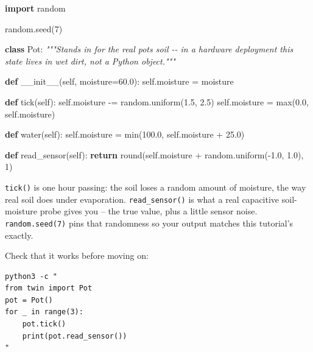 \documentclass[
  12pt,
  a4paper,
]{article}
\newenvironment{Shaded}{}{}
\newcommand{\BuiltInTok}[1]{\textcolor[rgb]{0.00,0.50,0.00}{#1}}
\newcommand{\CommentTok}[1]{\textcolor[rgb]{0.38,0.63,0.69}{\textit{#1}}}
\newcommand{\ControlFlowTok}[1]{\textcolor[rgb]{0.00,0.44,0.13}{\textbf{#1}}}
\newcommand{\DecValTok}[1]{\textcolor[rgb]{0.25,0.63,0.44}{#1}}
\newcommand{\FloatTok}[1]{\textcolor[rgb]{0.25,0.63,0.44}{#1}}
\newcommand{\FunctionTok}[1]{\textcolor[rgb]{0.02,0.16,0.49}{#1}}
\newcommand{\ImportTok}[1]{\textcolor[rgb]{0.00,0.50,0.00}{\textbf{#1}}}
\newcommand{\KeywordTok}[1]{\textcolor[rgb]{0.00,0.44,0.13}{\textbf{#1}}}
\newcommand{\NormalTok}[1]{#1}
\newcommand{\OperatorTok}[1]{\textcolor[rgb]{0.40,0.40,0.40}{#1}}
\newcommand{\VariableTok}[1]{\textcolor[rgb]{0.10,0.09,0.49}{#1}}
\begin{document}
\begin{Shaded}
\begin{Highlighting}[]
\ImportTok{import}\NormalTok{ random}

\NormalTok{random.seed(}\DecValTok{7}\NormalTok{)}


\KeywordTok{class}\NormalTok{ Pot:}
    \CommentTok{"""Stands in for the real pot\textquotesingle{}s soil {-}{-} in a hardware deployment this}
\CommentTok{    state lives in wet dirt, not a Python object."""}

    \KeywordTok{def} \FunctionTok{\_\_init\_\_}\NormalTok{(}\VariableTok{self}\NormalTok{, moisture}\OperatorTok{=}\FloatTok{60.0}\NormalTok{):}
        \VariableTok{self}\NormalTok{.moisture }\OperatorTok{=}\NormalTok{ moisture}

    \KeywordTok{def}\NormalTok{ tick(}\VariableTok{self}\NormalTok{):}
        \VariableTok{self}\NormalTok{.moisture }\OperatorTok{{-}=}\NormalTok{ random.uniform(}\FloatTok{1.5}\NormalTok{, }\FloatTok{2.5}\NormalTok{)}
        \VariableTok{self}\NormalTok{.moisture }\OperatorTok{=} \BuiltInTok{max}\NormalTok{(}\FloatTok{0.0}\NormalTok{, }\VariableTok{self}\NormalTok{.moisture)}

    \KeywordTok{def}\NormalTok{ water(}\VariableTok{self}\NormalTok{):}
        \VariableTok{self}\NormalTok{.moisture }\OperatorTok{=} \BuiltInTok{min}\NormalTok{(}\FloatTok{100.0}\NormalTok{, }\VariableTok{self}\NormalTok{.moisture }\OperatorTok{+} \FloatTok{25.0}\NormalTok{)}

    \KeywordTok{def}\NormalTok{ read\_sensor(}\VariableTok{self}\NormalTok{):}
        \ControlFlowTok{return} \BuiltInTok{round}\NormalTok{(}\VariableTok{self}\NormalTok{.moisture }\OperatorTok{+}\NormalTok{ random.uniform(}\OperatorTok{{-}}\FloatTok{1.0}\NormalTok{, }\FloatTok{1.0}\NormalTok{), }\DecValTok{1}\NormalTok{)}
\end{Highlighting}
\end{Shaded}

\texttt{tick()} is one hour passing: the soil loses a random amount of
moisture, the way real soil does under evaporation.
\texttt{read\_}\texttt{sensor()} is what a real capacitive
soil-moisture probe gives you -- the true value, plus a little sensor
noise. \texttt{random.seed(7)} pins that randomness so your output
matches this tutorial's exactly.

Check that it works before moving on:

\begin{verbatim}
python3 -c "
from twin import Pot
pot = Pot()
for _ in range(3):
    pot.tick()
    print(pot.read_sensor())
"
\end{verbatim}
\end{document}
